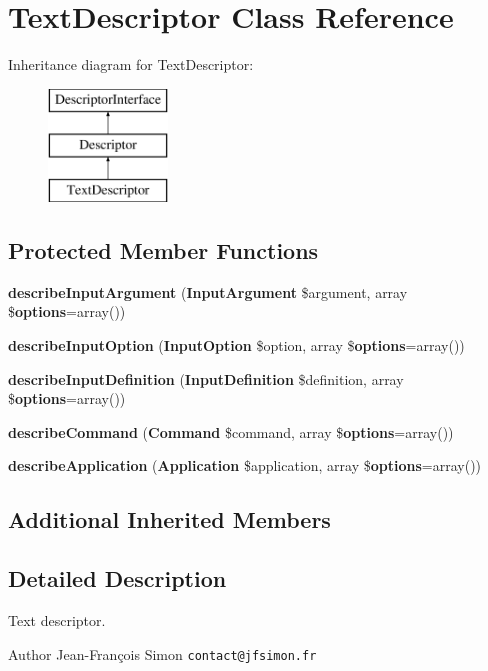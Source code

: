 \section{Text\+Descriptor Class Reference}
\label{class_symfony_1_1_component_1_1_console_1_1_descriptor_1_1_text_descriptor}
Inheritance diagram for Text\+Descriptor\+:\begin{figure}[H]
\begin{center}
\leavevmode
\includegraphics[height=3.000000cm]{class_symfony_1_1_component_1_1_console_1_1_descriptor_1_1_text_descriptor}
\end{center}
\end{figure}
\subsection*{Protected Member Functions}
\begin{DoxyCompactItemize}
\item 
{\bf describe\+Input\+Argument} ({\bf Input\+Argument} \$argument, array \${\bf options}=array())
\item 
{\bf describe\+Input\+Option} ({\bf Input\+Option} \$option, array \${\bf options}=array())
\item 
{\bf describe\+Input\+Definition} ({\bf Input\+Definition} \$definition, array \${\bf options}=array())
\item 
{\bf describe\+Command} ({\bf Command} \$command, array \${\bf options}=array())
\item 
{\bf describe\+Application} ({\bf Application} \$application, array \${\bf options}=array())
\end{DoxyCompactItemize}
\subsection*{Additional Inherited Members}


\subsection{Detailed Description}
Text descriptor.

\begin{DoxyAuthor}{Author}
Jean-\/\+François Simon {\tt contact@jfsimon.\+fr} 
\end{DoxyAuthor}


